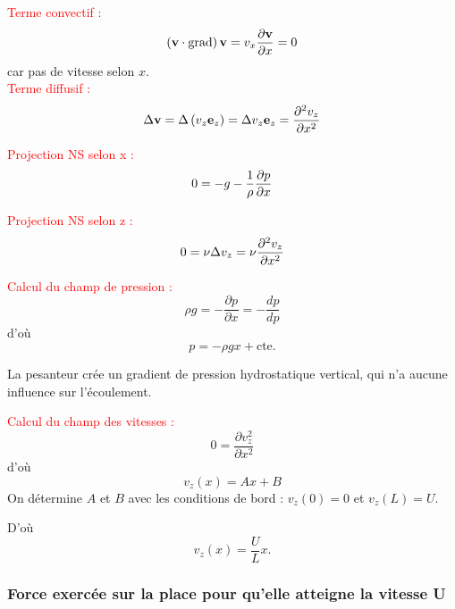 \documentclass[11pt,a4paper]{report}
\begin{document}
\textcolor{red}{Terme convectif :}
\begin{equation}
	\left(\bold{v}\cdot\bold{\text{grad}}\right)\bold{v} = v_x\frac{\partial \bold{v}}{\partial x} = 0
\end{equation}
car pas de vitesse selon $x$.\\

\textcolor{red}{Terme diffusif :}
\begin{equation}
	\Delta\bold{v} = \Delta\left(v_z\bold{e}_z\right) = \Delta v_z \bold{e}_z = \frac{\partial^2 v_z}{\partial x^2}\\
\end{equation}

\textcolor{red}{Projection NS selon x :}
\begin{equation}
	0 = -g - \frac{1}{\rho}\frac{\partial p}{\partial x}\\
\end{equation}

\textcolor{red}{Projection NS selon z :}
\begin{equation}
	0 = \nu \Delta v_z = \nu \frac{\partial^2 v_z}{\partial x^2}\\
\end{equation}

\textcolor{red}{Calcul du champ de pression :}
\begin{equation}
	\rho g = - \frac{\partial p}{\partial x} = - \frac{dp}{dp}
\end{equation}
d'où
\begin{equation}
	p = -\rho g x + \text{cte}.
\end{equation}

La pesanteur crée un gradient de pression hydrostatique vertical, qui n'a aucune influence sur l'écoulement.

\textcolor{red}{Calcul du champ des vitesses :}
\begin{equation}
	0 = \frac{\partial v_z^2}{\partial x^2}
\end{equation}
d'où 
\begin{equation}
	v_z(x) = Ax + B
\end{equation}
On détermine $A$ et $B$ avec les conditions de bord : $v_z(0) = 0$ et $v_z(L) = U$.

D'où
\begin{equation}
	v_z(x) = \frac{U}{L}x.
\end{equation}

\subsubsection{Force exercée sur la place pour qu'elle atteigne la vitesse U}
\end{document}
